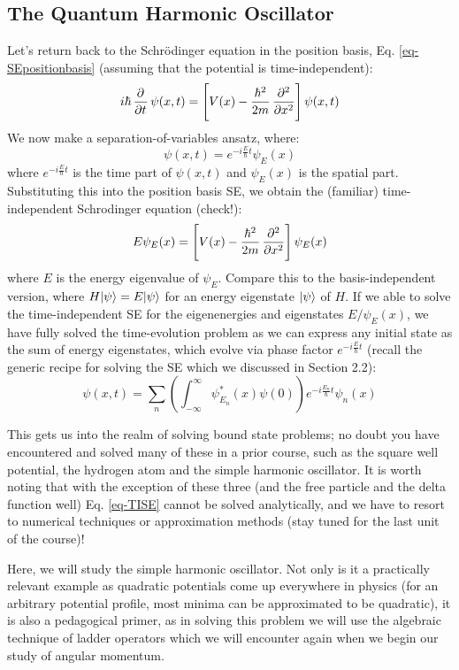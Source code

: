 \subsection{The Quantum Harmonic Oscillator}
Let's return back to the Schr\"{o}dinger equation in the position basis, Eq. \eqref{eq-SEpositionbasis} (assuming that the potential is time-independent):
\begin{equation}
    i\hbar\dpd{}{t}\psi(x, t) = \left[V(x) - \frac{\hbar^2}{2m}\dpd[2]{}{x}\right]\psi(x, t)
\end{equation}
We now make a separation-of-variables ansatz, where:
\begin{equation}
    \psi(x, t) = e^{-i\frac{E}{\hbar}t}\psi_E(x)
\end{equation}
where $e^{-i\frac{E}{\hbar}t}$ is the time part of $\psi(x, t)$ and $\psi_E(x)$ is the spatial part. Substituting this into the position basis SE, we obtain the (familiar) time-independent Schrodinger equation (check!):
\begin{equation}\label{eq-TISE}
    E\psi_E(x) = \left[V(x) - \frac{\hbar^2}{2m}\dpd[2]{}{x}\right]\psi_E(x)
\end{equation}
where $E$ is the energy eigenvalue of $\psi_E$. Compare this to the basis-independent version, where $H\lvert \psi \rangle = E\lvert \psi \rangle$ for an energy eigenstate $\lvert \psi \rangle$ of $H$. If we able to solve the time-independent SE for the eigenenergies and eigenstates $E/\psi_E(x)$, we have fully solved the time-evolution problem as we can express any initial state as the sum of energy eigenstates, which evolve via phase factor $e^{-i\frac{E}{\hbar}t}$ (recall the generic recipe for solving the SE which we discussed in Section 2.2):
\begin{equation}
    \psi(x, t) = \sum_n \left(\int_{-\infty}^\infty \psi_{E_n}^*(x) \psi(0)\right) e^{-i\frac{E_n}{\hbar}t} \psi_n(x)
\end{equation}

This gets us into the realm of solving bound state problems; no doubt you have encountered and solved many of these in a prior course, such as the square well potential, the hydrogen atom and the simple harmonic oscillator. It is worth noting that with the exception of these three (and the free particle and the delta function well) Eq. \eqref{eq-TISE} cannot be solved analytically, and we have to resort to numerical techniques or approximation methods (stay tuned for the last unit of the course)!

Here, we will study the simple harmonic oscillator. Not only is it a practically relevant example as quadratic potentials come up everywhere in physics (for an arbitrary potential profile, most minima can be approximated to be quadratic), it is also a pedagogical primer, as in solving this problem we will use the algebraic technique of ladder operators which we will encounter again when we begin our study of angular momentum.

